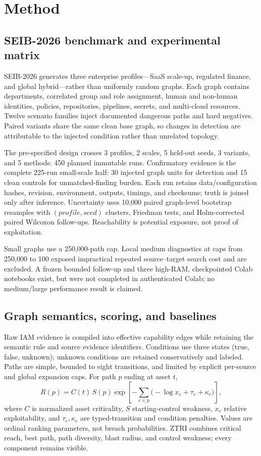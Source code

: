\documentclass[10pt]{article}
\begin{document}
\section{Method}

\subsection{SEIB-2026 benchmark and experimental matrix}

SEIB-2026 generates three enterprise profiles---SaaS scale-up, regulated finance, and global hybrid---rather than uniformly random graphs. Each graph contains departments, correlated group and role assignment, human and non-human identities, policies, repositories, pipelines, secrets, and multi-cloud resources. Twelve scenario families inject documented dangerous paths and hard negatives. Paired variants share the same clean base graph, so changes in detection are attributable to the injected condition rather than unrelated topology.

The pre-specified design crosses 3 profiles, 2 scales, 5 held-out seeds, 3 variants, and 5 methods: 450 planned immutable runs. Confirmatory evidence is the complete 225-run small-scale half: 30 injected graph units for detection and 15 clean controls for unmatched-finding burden. Each run retains data/configuration hashes, revision, environment, outputs, timings, and checksums; truth is joined only after inference. Uncertainty uses 10,000 paired graph-level bootstrap resamples with $(profile, seed)$ clusters, Friedman tests, and Holm-corrected paired Wilcoxon follow-ups. Reachability is potential exposure, not proof of exploitation.

Small graphs use a 250,000-path cap. Local medium diagnostics at caps from 250,000 to 100 exposed impractical repeated source--target search cost and are excluded. A frozen bounded follow-up and three high-RAM, checkpointed Colab notebooks exist, but were not completed in authenticated Colab; no medium/large performance result is claimed.

\subsection{Graph semantics, scoring, and baselines}

Raw IAM evidence is compiled into effective capability edges while retaining the semantic rule and source evidence identifiers. Conditions use three states (true, false, unknown); unknown conditions are retained conservatively and labeled. Paths are simple, bounded to eight transitions, and limited by explicit per-source and global expansion caps. For path $p$ ending at asset $t$,
\[
R(p)=C(t)\,S(p)\exp\!\left[-\sum_{e\in p}\bigl(-\log x_e+\tau_e+\kappa_e\bigr)\right],
\]
where $C$ is normalized asset criticality, $S$ starting-control weakness, $x_e$ relative exploitability, and $\tau_e,\kappa_e$ are typed-transition and condition penalties. Values are ordinal ranking parameters, not breach probabilities. ZTRI combines critical reach, best path, path diversity, blast radius, and control weakness; every component remains visible.
\end{document}

